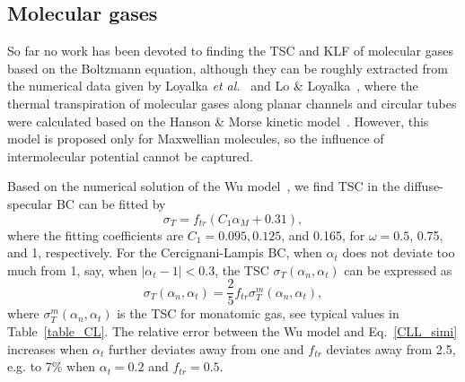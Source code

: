 

\subsection{Molecular gases}\label{sec:results2}

So far no work has been devoted to finding the TSC and KLF of molecular gases based on the Boltzmann equation, although they can be roughly extracted from the numerical data given by Loyalka \textit{et al.}~\cite{loyalka1982thermal} and Lo \& Loyalka~\cite{lo1989flow}, where the thermal transpiration of molecular gases along planar channels and circular tubes were calculated based on the Hanson \& Morse kinetic model~\cite{Hanson1967PoF}. However, this model is proposed only for Maxwellian molecules, so the influence of intermolecular potential cannot be captured. 


Based on the numerical solution of the Wu model~\cite{LeiJFM2015}, we find TSC in the diffuse-specular BC can be fitted by 
\begin{equation}\label{eq:tsc_tmac_ftr}
\sigma_T=f_{tr}\left(C_1 \alpha_M+0.31\right),
\end{equation}
where the fitting coefficients are $C_1=0.095, 0.125$, and 0.165,  for $\omega=0.5$, 0.75, and 1, respectively. %
For the Cercignani-Lampis  BC, when $\alpha_t$ does not deviate too much from 1, say, when $|\alpha_t-1|<0.3$, the TSC $\sigma_T(\alpha_n,\alpha_t)$ can be expressed as
\begin{equation}\label{CLL_simi}
\sigma_T(\alpha_n,\alpha_t)=\frac{2}{5}f_{tr}\sigma_T^m(\alpha_n,\alpha_t),
\end{equation}
where $\sigma_T^m(\alpha_n,\alpha_t)$ is the TSC for monatomic gas, see typical values in Table~\ref{table_CL}. The relative error between the Wu model and Eq.~\eqref{CLL_simi} increases when $\alpha_t$ further deviates away from one and $f_{tr}$ deviates away from 2.5, e.g. to 7\%  when $\alpha_t=0.2$ and $f_{tr}=0.5$.

